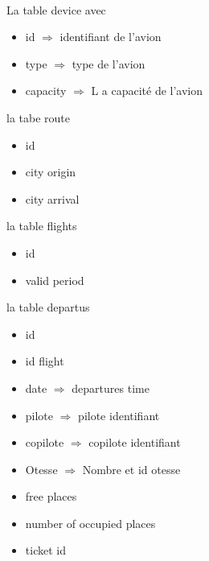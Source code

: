 \documentclass{article}
\begin{document}
        \.\\
        La table device avec         
            \begin{itemize}
                \centering
                \item id $\Rightarrow$ identifiant de l'avion
                \item type $\Rightarrow$ type de l'avion
                \item capacity $\Rightarrow$ L a capacité de l'avion                
            \end{itemize}
        
        la tabe route
            \begin{itemize}
                \centering
                \item id 
                \item city origin
                \item city arrival
            \end{itemize}
        
        la table flights
            \begin{itemize}
                \centering
                \item id
                \item valid period
            \end{itemize}
        
        la table departus
            \begin{itemize}
                \centering
                \item id 
                \item id flight 
                \item date $\Rightarrow$ departures time
                \item pilote $\Rightarrow$ pilote identifiant
                \item copilote $\Rightarrow$ copilote identifiant
                \item Otesse $\Rightarrow$ Nombre et id otesse
                \item free places
                \item number of occupied places
                \item ticket id
            \end{itemize}
\end{document}
